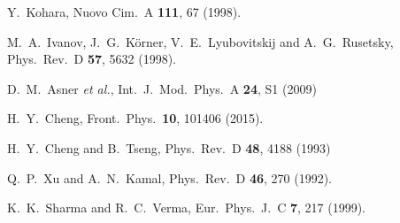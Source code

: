 \begin{thebibliography}{99}
Y.~Kohara,
  Nuovo Cim.\ A {\bf 111}, 67 (1998).

  M.~A.~Ivanov, J.~G.~K\"orner, V.~E.~Lyubovitskij and A.~G.~Rusetsky,
  Phys.\ Rev.\ D {\bf 57}, 5632 (1998).

  D.~M.~Asner {\it et al.},
  Int.\ J.\ Mod.\ Phys.\ A {\bf 24}, S1 (2009)
  
  
  H.~Y.~Cheng,
  Front.\ Phys.\ {\bf 10}, 101406 (2015).
  

%

  H.~Y.~Cheng and B.~Tseng,
  Phys.\ Rev.\ D {\bf 48}, 4188 (1993)

Q.~P.~Xu and A.~N.~Kamal,
  Phys.\ Rev.\ D {\bf 46}, 270 (1992).

 K.~K.~Sharma and R.~C.~Verma,
  Eur.\ Phys.\ J.\ C {\bf 7}, 217 (1999).



\end{thebibliography}
